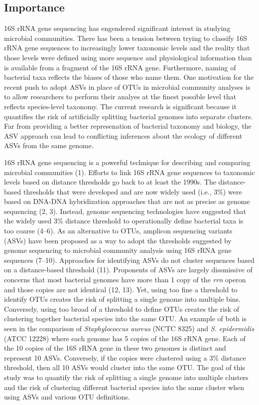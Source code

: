 \documentclass[
]{article}
\begin{document}
\hypertarget{importance}{%
\subsection{Importance}\label{importance}}

16S rRNA gene sequencing has engendered significant interest in studying
microbial communities. There has been a tension between trying to
classify 16S rRNA gene sequences to increasingly lower taxonomic levels
and the reality that those levels were defined using more sequence and
physiological information than is available from a fragment of the 16S
rRNA gene. Furthermore, naming of bacterial taxa reflects the biases of
those who name them. One motivation for the recent push to adopt ASVs in
place of OTUs in microbial community analyses is to allow researchers to
perform their analyes at the finest possible level that reflects
species-level taxonomy. The current research is significant because it
quantifies the risk of artificially splitting bacterial genomes into
separate clusters. Far from providing a better represenation of
bacterial taxonomy and biology, the ASV approach can lead to conflicting
inferences about the ecology of different ASVs from the same genome.

\newpage

16S rRNA gene sequencing is a powerful technique for describing and
comparing microbial communities (1). Efforts to link 16S rRNA gene
sequences to taxonomic levels based on distance thresholds go back to at
least the 1990s. The distance-based thresholds that were developed and
are now widely used (i.e., 3\%) were based on DNA-DNA hybridization
approaches that are not as precise as genome sequencing (2, 3). Instead,
genome sequencing technologies have suggested that the widely used 3\%
distance threshold to operationally define bacterial taxa is too coarse
(4--6). As an alternative to OTUs, amplicon sequencing variants (ASVs)
have been proposed as a way to adopt the thresholds suggested by genome
sequencing to microbial community analysis using 16S rRNA gene sequences
(7--10). Approaches for identifying ASVs do not cluster sequences based
on a distance-based threshold (11). Proponents of ASVs are largely
dissmissive of concerns that most bacterial genomes have more than 1
copy of the \emph{rrn} operon and those copies are not identical (12,
13). Yet, using too fine a threshold to identify OTUs creates the risk
of splitting a single genome into multiple bins. Conversely, using too
broad of a threshold to define OTUs creates the risk of clustering
together bacterial species into the same OTU. An example of both is seen
in the comparison of \emph{Staphylococcus aureus} (NCTC 8325) and
\emph{S. epidermidis} (ATCC 12228) where each genome has 5 copies of the
16S rRNA gene. Each of the 10 copies of the 16S rRNA gene in these two
genomes is distinct and represent 10 ASVs. Conversely, if the copies
were clustered using a 3\% distance threshold, then all 10 ASVs would
cluster into the same OTU. The goal of this study was to quantify the
risk of splitting a single genome into multiple clusters and the risk of
clustering different bacterial species into the same cluster when using
ASVs and various OTU definitions.
\end{document}
